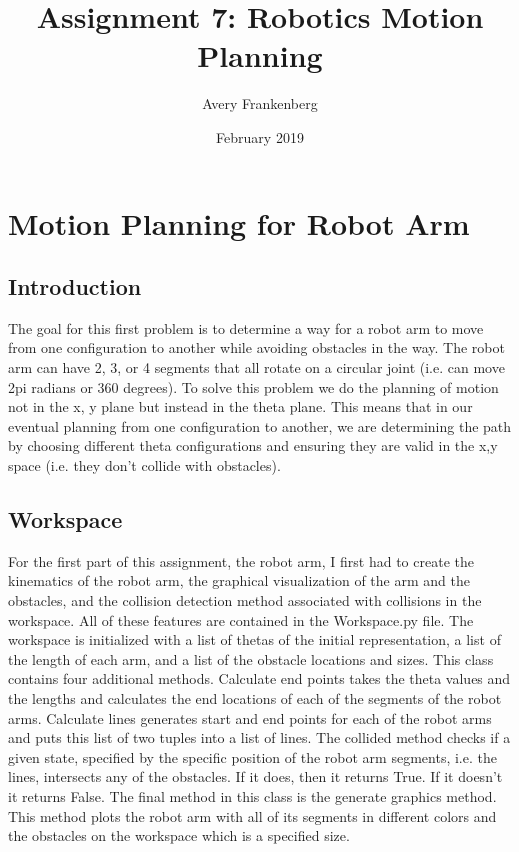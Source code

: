 \documentclass{article}
\title{Assignment 7: Robotics Motion Planning}
\author{Avery Frankenberg}
\date{February 2019}
\begin{document}
\maketitle

\section{Motion Planning for Robot Arm}
\subsection{Introduction}
The goal for this first problem is to determine a way for a robot arm to move from one configuration to another while avoiding obstacles in the way. The robot arm can have 2, 3, or 4 segments that all rotate on a circular joint (i.e. can move 2pi radians or 360 degrees). To solve this problem we do the planning of motion not in the x, y plane but instead in the theta plane. This means that in our eventual planning from one configuration to another, we are determining the path by choosing different theta configurations and ensuring they are valid in the x,y space (i.e. they don't collide with obstacles). 

\subsection{Workspace}
For the first part of this assignment, the robot arm, I first had to create the kinematics of the robot arm, the graphical visualization of the arm and the obstacles, and the collision detection method associated with collisions in the workspace. All of these features are contained in the Workspace.py file. The workspace is initialized with a list of thetas of the initial representation, a list of the length of each arm, and a list of the obstacle locations and sizes. This class contains four additional methods. Calculate end points takes the theta values and the lengths and calculates the end locations of each of the segments of the robot arms. Calculate lines generates start and end points for each of the robot arms and puts this list of two tuples into a list of lines. The collided method checks if a given state, specified by the specific position of the robot arm segments, i.e. the lines, intersects any of the obstacles. If it does, then it returns True. If it doesn't it returns False. The final method in this class is the generate graphics method. This method plots the robot arm with all of its segments in different colors and the obstacles on the workspace which is a specified size. 
\end{document}
